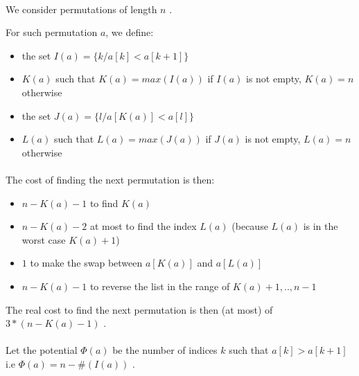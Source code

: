 

\paragraph{}
We consider permutations of length $n$ .

For such permutation $a$, we define:
\begin{itemize}
\item{} the set $I(a)=\{k/ a[k]<a[k+1]\}$
\item{} $K(a)$ such that $K(a)= max(I(a))$ if $I(a)$ is not empty, $K(a)=n$ otherwise
\item{} the set $J(a)=\{l/ a[K(a)]<a[l]\}$
\item{} $L(a)$ such that $L(a) = max(J(a))$ if $J(a)$ is not empty, $L(a)=n$ otherwise
\end{itemize}

\paragraph{}
The cost of finding the next permutation is then:
\begin{itemize}
\item{} $n-K(a)-1$ to find $K(a)$
\item{} $n-K(a)-2$ at most to find the index $L(a)$ (because $L(a)$ is in the worst case $K(a)+1$)
\item{} $1$ to make the swap between $a[K(a)]$ and $a[L(a)]$
\item{} $n-K(a)-1$ to reverse the list in the range of $K(a)+1,..,n-1$
\end{itemize}
The real cost to find the next permutation is then (at most) of $3*(n-K(a)-1)$ .

\paragraph{}
Let the potential $\Phi(a)$ be the number of indices $k$ such that $a[k]>a[k+1]$
\newline
i.e $\Phi(a)=n-\#(I(a))$ .

